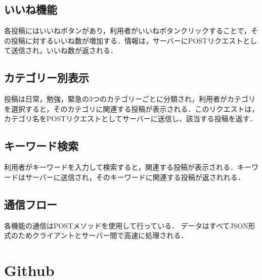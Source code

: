 \documentclass[uplatex,dvipdfmx]{jsarticle}
\begin{document}
\subsection{いいね機能}
各投稿にはいいねボタンがあり，利用者がいいねボタンクリックすることで，その投稿に対するいいね数が増加する．情報は，サーバーにPOSTリクエストとして送信され，いいね数が返される．
\subsection{カテゴリー別表示}
投稿は日常，勉強，緊急の3つのカテゴリーごとに分類され，利用者がカテゴリを選択すると，そのカテゴリに関連する投稿が表示される．このリクエストは，カテゴリ名をPOSTリクエストとしてサーバーに送信し、該当する投稿を返す．
\subsection{キーワード検索}
利用者がキーワードを入力して検索すると，関連する投稿が表示される．キーワードはサーバーに送信され，そのキーワードに関連する投稿が返されれる．

\subsection{通信フロー}
各機能の通信はPOSTメソッドを使用して行っている．
データはすべてJSON形式のためクライアントとサーバー間で高速に処理される．

\section{Github}
\end{document}
